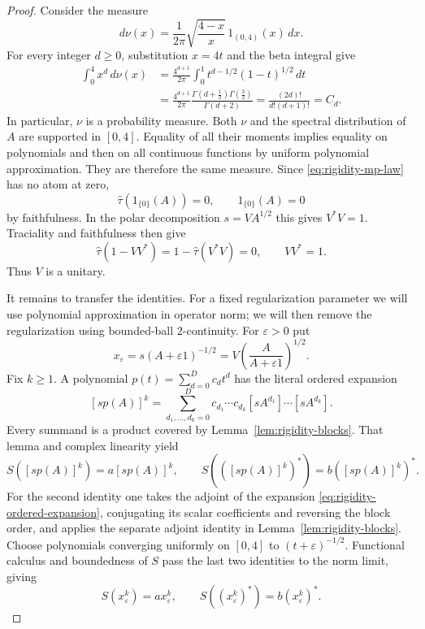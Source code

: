 \begin{proof}
Consider the measure
\begin{equation}\label{eq:rigidity-mp-law}
 d\nu(x)=\frac1{2\pi}\sqrt{\frac{4-x}{x}}\,
                1_{(0,4)}(x)\,dx.
\end{equation}
For every integer $d\geq0$, substitution $x=4t$ and the beta integral
give
\[
 \begin{split}
 \int_0^4 x^d\,d\nu(x)
 &=\frac{4^{d+1}}{2\pi}
     \int_0^1 t^{d-1/2}(1-t)^{1/2}\,dt\\
 &=\frac{4^{d+1}}{2\pi}
     \frac{\Gamma(d+\tfrac12)\Gamma(\tfrac32)}{\Gamma(d+2)}
 =\frac{(2d)!}{d!(d+1)!}=C_d.
 \end{split}
\]
In particular, $\nu$ is a probability measure.  Both $\nu$ and the
spectral distribution of $A$ are supported in $[0,4]$.  Equality of
all their moments implies equality on polynomials and then on all
continuous functions by uniform polynomial approximation.  They are
therefore the same measure.  Since \eqref{eq:rigidity-mp-law} has no
atom at zero,
\[
 \widehat\tau(1_{\{0\}}(A))=0,
 \qquad 1_{\{0\}}(A)=0
\]
by faithfulness.  In the polar decomposition $s=VA^{1/2}$ this gives
$V^*V=1$.  Traciality and faithfulness then give
\[
 \widehat\tau(1-VV^*)=1-\widehat\tau(V^*V)=0,
 \qquad VV^*=1.
\]
Thus $V$ is a unitary.

It remains to transfer the identities.  For a fixed regularization
parameter we will use polynomial approximation in operator norm;
we will then remove the regularization using bounded-ball $2$-continuity.
For $\varepsilon>0$ put
\[
 x_\varepsilon=s(A+\varepsilon1)^{-1/2}
 =V\left(\frac{A}{A+\varepsilon1}\right)^{1/2}.
\]
Fix $k\geq1$.  A polynomial $p(t)=\sum_{d=0}^D c_dt^d$ has the
literal ordered expansion
\begin{equation}\label{eq:rigidity-ordered-expansion}
 [sp(A)]^k
 =\sum_{d_1,\ldots,d_k=0}^D c_{d_1}\cdots c_{d_k}
       [sA^{d_1}]\cdots[sA^{d_k}].
\end{equation}
Every summand is a product covered by Lemma~\ref{lem:rigidity-blocks}.
That lemma and complex linearity yield
\[
 S([sp(A)]^k)=a[sp(A)]^k,
 \qquad S(([sp(A)]^k)^*)=b([sp(A)]^k)^*.
\]
For the second identity one takes the adjoint of the expansion
\eqref{eq:rigidity-ordered-expansion}, conjugating its scalar
coefficients and reversing the block order, and applies the separate
adjoint identity in Lemma~\ref{lem:rigidity-blocks}.
Choose polynomials converging uniformly on $[0,4]$ to
$(t+\varepsilon)^{-1/2}$.  Functional calculus and boundedness of $S$
pass the last two identities to the norm limit, giving
\begin{equation}\label{eq:rigidity-regularized-powers}
 S(x_\varepsilon^k)=ax_\varepsilon^k,
 \qquad S((x_\varepsilon^k)^*)=b(x_\varepsilon^k)^*.
\end{equation}


\end{proof}
